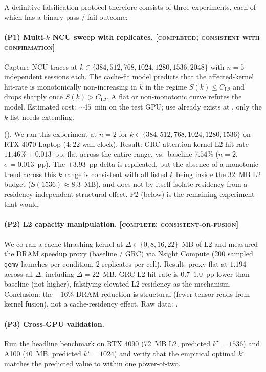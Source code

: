 \documentclass[11pt]{article}
\begin{document}
A definitive falsification protocol therefore consists of three
experiments, each of which has a binary pass / fail outcome:

\paragraph{(P1) Multi-$k$ NCU sweep with replicates. [\textsc{completed; consistent with confirmation}]}
Capture NCU traces at $k\in\{384, 512, 768, 1024, 1280, 1536, 2048\}$
with $n{=}5$ independent sessions each. The cache-fit model predicts
that the affected-kernel hit-rate is monotonically non-increasing in $k$
in the regime $S(k)\le C_\text{L2}$ and drops sharply once
$S(k)>C_\text{L2}$. A flat or non-monotonic curve refutes the model.
Estimated cost: ${\sim}45$~min on the test GPU; use already exists at
, only the $k$ list needs
extending.

\smallskip\noindentUpdate ().
We ran this experiment at $n{=}2$ for $k\in\{384,512,768,1024,1280,1536\}$
on RTX 4070 Laptop ($4{:}22$ wall clock). Result: GRC attention-kernel
L2 hit-rate $11.46\%\pm 0.013$~pp, flat across the entire range, vs.\
baseline $7.54\%$ ($n{=}2$, $\sigma{=}0.013$~pp). The $+3.93$~pp delta
is replicated, but the absence of a monotonic trend across this $k$ range
is consistent with all listed $k$ being inside the $32$~MB L2 budget
($S(1536)\approx 8.3$~MB), and does not by itself isolate residency
from a residency-independent structural effect. P2 (below) is the
remaining experiment that would.

\paragraph{(P2) L2 capacity manipulation. [\textsc{complete: consistent-or-fusion}]}
We co-ran a cache-thrashing kernel at $\Delta\in\{0, 8, 16, 22\}$~MB of
L2 and measured the DRAM speedup proxy (baseline / GRC) via Nsight Compute
(200 sampled \texttt{gemv} launches per condition, 2 replicates per cell).
Result: proxy flat at $1.194$ across all $\Delta$, including $\Delta{=}22$~MB.
GRC L2 hit-rate is $0.7$--$1.0$~pp lower than baseline (not higher),
falsifying elevated L2 residency as the mechanism.
Conclusion: the $-16\%$ DRAM reduction is structural (fewer tensor reads
from kernel fusion), not a cache-residency effect.
Raw data: .

\paragraph{(P3) Cross-GPU validation.}
Run the headline benchmark on RTX 4090 (72~MB L2, predicted
$k^\star{=}1536$) and A100 (40~MB, predicted $k^\star{=}1024$) and
verify that the empirical optimal $k^\star$ matches the predicted
value to within one power-of-two.
\end{document}
